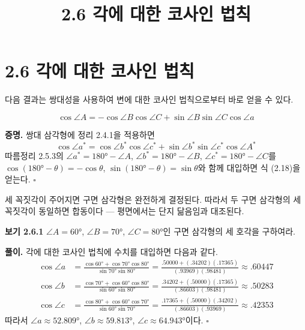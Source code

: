\documentclass{article}
\title{2.6 각에 대한 코사인 법칙}
\date{}
\author{}
\begin{document}
\maketitle

\section*{2.6 각에 대한 코사인 법칙}

다음 결과는 쌍대성을 사용하여 변에 대한 코사인 법칙으로부터 바로 얻을 수 있다.

\begin{tcolorbox}[
  colback=red!4, colframe=red!60!black,
  title=따름정리 2.6.1 (각에 대한 코사인 법칙),
  fonttitle=\bfseries, boxrule=0.5mm, arc=3mm]

\begin{equation}
  \cos\angle A = -\cos\angle B\cos\angle C + \sin\angle B\sin\angle C\cos\angle a
  \tag{2.18}
\end{equation}

\end{tcolorbox}

\textbf{증명.}\quad
쌍대 삼각형에 정리 2.4.1을 적용하면
\begin{equation}
  \cos\angle a^* = \cos\angle b^*\cos\angle c^* + \sin\angle b^*\sin\angle c^*\cos\angle A^*
  \tag{2.19}
\end{equation}
따름정리 2.5.3의 $\angle a^* = 180°-\angle A$, $\angle b^* = 180°-\angle B$, $\angle c^* = 180°-\angle C$를
$\cos(180°-\theta)=-\cos\theta$, $\sin(180°-\theta)=\sin\theta$와 함께 대입하면 식 (2.18)을 얻는다.
\hfill $\square$

\medskip
세 꼭짓각이 주어지면 구면 삼각형은 완전하게 결정된다.
따라서 두 구면 삼각형의 세 꼭짓각이 동일하면 합동이다 — 평면에서는 단지 닮음임과 대조된다.

\bigskip
\textbf{보기 2.6.1}\quad
$\angle A = 60°$, $\angle B = 70°$, $\angle C = 80°$인 구면 삼각형의 세 호각을 구하여라.

\medskip
\textbf{풀이.}\quad
각에 대한 코사인 법칙에 수치를 대입하면 다음과 같다.
\begin{align*}
  \cos\angle a
  &= \frac{\cos 60° + \cos 70°\cos 80°}{\sin 70°\sin 80°}
   = \frac{.50000 + (.34202)(.17365)}{(.93969)(.98481)}
   \approx .60447 \\[4pt]
  \cos\angle b
  &= \frac{\cos 70° + \cos 60°\cos 80°}{\sin 60°\sin 80°}
   = \frac{.34202 + (.50000)(.17365)}{(.86603)(.98481)}
   \approx .50283 \\[4pt]
  \cos\angle c
  &= \frac{\cos 80° + \cos 60°\cos 70°}{\sin 60°\sin 70°}
   = \frac{.17365 + (.50000)(.34202)}{(.86603)(.93969)}
   \approx .42353
\end{align*}
따라서 $\angle a \approx 52.809°$, $\angle b \approx 59.813°$, $\angle c \approx 64.943°$이다. \hfill $\square$
\end{document}
